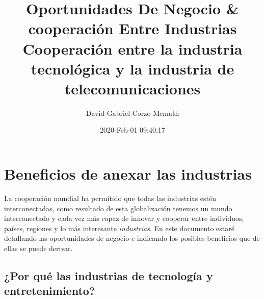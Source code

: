 \documentclass{article}
\title{ Oportunidades De Negocio \& cooperación Entre Industrias \\ 
\Huge Cooperación entre la industria tecnológica y la industria de telecomunicaciones }
\author{David Gabriel Corzo Mcmath}
\date{2020-Feb-01 09:40:17}
\begin{document}
\maketitle

\section{Beneficios de anexar las industrias}
La cooperación mundial ha permitido que todas las industrias estén interconectadas, como resultado de esta globalización tenemos un mundo interconectado y cada vez más capaz de innovar y cooperar entre individuos, países, regiones y lo más interesante \emph{industrias}. En este documento estaré detallando las oportunidades de negocio e indicando los posibles beneficios que de ellas se puede derivar. 

\subsection{¿Por qué las industrias de tecnología y entretenimiento?}
\end{document}
